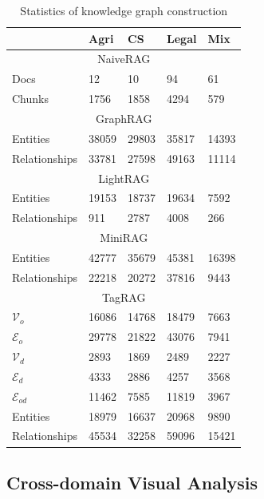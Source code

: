 \documentclass[11pt]{article}
\begin{document}
\begin{table}[h]
\centering
\small
\begin{tabular}{l|llll}
    \toprule
    & Agri & CS & Legal & Mix \\ \midrule
    \multicolumn{5}{c}{NaiveRAG} \\ \midrule
    Docs & 12 & 10 & 94 & 61 \\
    Chunks & 1756 & 1858 & 4294 & 579 \\ \midrule
    \multicolumn{5}{c}{GraphRAG} \\ \midrule
    Entities & 38059 & 29803 & 35817 & 14393 \\
    Relationships & 33781 & 27598 & 49163 & 11114 \\ \midrule
    \multicolumn{5}{c}{LightRAG} \\ \midrule
    Entities & 19153 & 18737 & 19634 & 7592 \\
    Relationships & 911 & 2787 & 4008 & 266 \\ \midrule
    \multicolumn{5}{c}{MiniRAG} \\ \midrule
    Entities & 42777 & 35679 & 45381 & 16398 \\
    Relationships & 22218 & 20272 & 37816 & 9443 \\ \midrule
    \multicolumn{5}{c}{TagRAG} \\ \midrule
    $\mathcal{V}_o$ & 16086 & 14768 & 18479 & 7663 \\
    $\mathcal{E}_o$ & 29778 & 21822 & 43076 & 7941 \\
    $\mathcal{V}_d$ & 2893 & 1869 & 2489 & 2227 \\
    $\mathcal{E}_d$ & 4333 & 2886 & 4257 & 3568 \\
    $\mathcal{E}_{od}$ & 11462 & 7585 & 11819 & 3967 \\
    Entities & 18979 & 16637 & 20968 & 9890 \\
    Relationships & 45534 & 32258 & 59096 & 15421 \\ \midrule
    \bottomrule
\end{tabular}
\caption{Statistics of knowledge graph construction}
\label{tab:statistics of knowledge graph construction}
\end{table}



\subsection{Cross-domain Visual Analysis}
\end{document}
